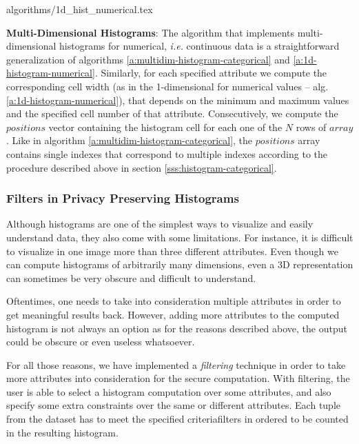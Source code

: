 {algorithms/1d_hist_numerical.tex}



\textbf{Multi-Dimensional Histograms}:
The algorithm that implements multi\hyp dimensional histograms for numerical, \textit{i.e.} continuous data is a straightforward generalization of algorithms \ref{a:multidim-histogram-categorical} and \ref{a:1d-histogram-numerical}.
Similarly, for each specified attribute we compute the corresponding cell width (as in the 1\hyp dimensional for numerical values -- alg. \ref{a:1d-histogram-numerical}), that depends on the minimum and maximum values and the specified cell number of that attribute.
Consecutively, we compute the $positions$ vector containing the histogram cell for each one of the $N$ rows of $array$.
Like in algorithm \ref{a:multidim-histogram-categorical}, the $positions$ array contains single indexes that correspond to multiple indexes according to the procedure described above in section \ref{sss:histogram-categorical}.





\subsubsection{Filters in Privacy Preserving Histograms}\label{sss:histogram-filters}
Although histograms are one of the simplest ways to visualize and easily understand data, they also come with some limitations.
For instance, it is difficult to visualize in one image more than three different attributes.
Even though we can compute histograms of arbitrarily many dimensions, even a 3D representation can sometimes  be very obscure and difficult to understand.

Oftentimes, one needs to take into consideration multiple attributes in order to get meaningful results back.
However, adding more attributes to the computed histogram is not always an option as for the reasons described above, the output could be obscure or even useless whatsoever.

For all those reasons, we have implemented a \textit{filtering} technique in order to take more attributes into consideration for the secure computation.
With filtering, the user is able to select a histogram computation over some attributes, and also specify some extra constraints over the same or different attributes.
Each tuple from the dataset has to meet the specified criteria\myslash filters in ordered to be counted in the resulting histogram.

